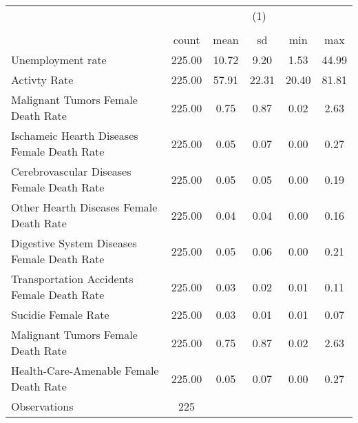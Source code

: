 {
\def\sym#1{\ifmmode^{#1}\else\(^{#1}\)\fi}
\begin{tabular}{l*{1}{ccccc}}
\hline\hline
                    &\multicolumn{5}{c}{(1)}                                                  \\
                    &\multicolumn{5}{c}{}                                                     \\
                    &       count         &        mean&          sd&         min&         max\\
\hline
Unemployment rate   &      225.00         &       10.72&        9.20&        1.53&       44.99\\
Activty Rate        &      225.00         &       57.91&       22.31&       20.40&       81.81\\
Malignant Tumors Female Death Rate&      225.00         &        0.75&        0.87&        0.02&        2.63\\
Ischameic Hearth Diseases Female Death Rate&      225.00         &        0.05&        0.07&        0.00&        0.27\\
Cerebrovascular Diseases Female Death Rate&      225.00         &        0.05&        0.05&        0.00&        0.19\\
Other Hearth Diseases Female Death Rate&      225.00         &        0.04&        0.04&        0.00&        0.16\\
Digestive System Diseases Female Death Rate&      225.00         &        0.05&        0.06&        0.00&        0.21\\
Transportation Accidents Female Death Rate&      225.00         &        0.03&        0.02&        0.01&        0.11\\
Sucidie Female Rate &      225.00         &        0.03&        0.01&        0.01&        0.07\\
Malignant Tumors Female Death Rate&      225.00         &        0.75&        0.87&        0.02&        2.63\\
Health-Care-Amenable Female Death Rate&      225.00         &        0.05&        0.07&        0.00&        0.27\\
\hline
Observations        &         225         &            &            &            &            \\
\hline\hline
\end{tabular}
}
